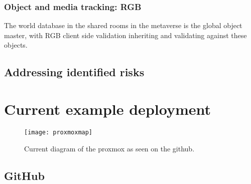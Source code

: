 \subsection{Object and media tracking: RGB}
The world database in the shared rooms in the metaverse is the global object master, with RGB client side validation inheriting and validating against these objects.\par
\section{Addressing identified risks}
\chapter{Current example deployment }
\begin{figure*}[ht]\centering %
	\texttt{[image: proxmoxmap]}
	\caption{Current diagram of the proxmox as seen on the github.}
	\label{fig:proxmoxmap}
\end{figure*}
\section{GitHub }
